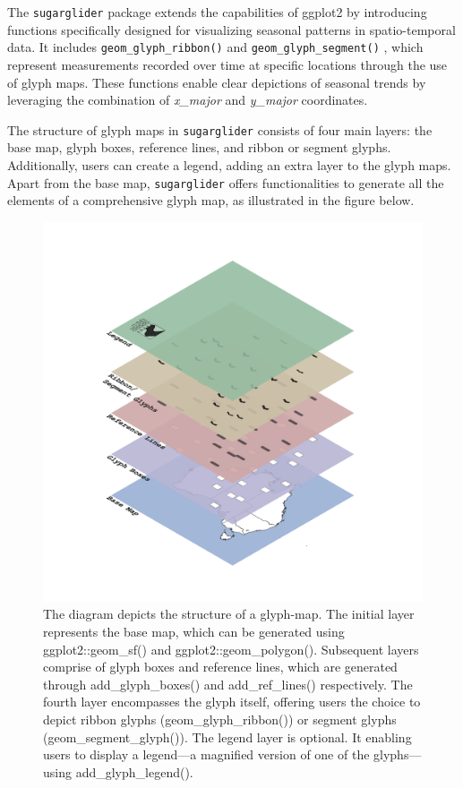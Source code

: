 The \texttt{sugarglider} package extends the capabilities of ggplot2 by introducing functions specifically designed for visualizing seasonal patterns in spatio-temporal data. It includes \texttt{geom\_glyph\_ribbon()} and \texttt{geom\_glyph\_segment()} , which represent measurements recorded over time at specific locations through the use of glyph maps. These functions enable clear depictions of seasonal trends by leveraging the combination of \emph{x\_major} and \emph{y\_major} coordinates.

The structure of glyph maps in \texttt{sugarglider} consists of four main layers: the base map, glyph boxes, reference lines, and ribbon or segment glyphs. Additionally, users can create a legend, adding an extra layer to the glyph maps. Apart from the base map, \texttt{sugarglider} offers functionalities to generate all the elements of a comprehensive glyph map, as illustrated in the figure below.

\begin{figure}
\includegraphics[width=36.11in]{figures/glyphmap-layers} \caption{The diagram depicts the structure of a glyph-map. The initial layer represents the base map, which can be generated using ggplot2::geom_sf() and ggplot2::geom_polygon(). Subsequent layers comprise of glyph boxes and reference lines, which are generated through add_glyph_boxes() and add_ref_lines() respectively. The fourth layer encompasses the glyph itself, offering users the choice to depict ribbon glyphs (geom_glyph_ribbon()) or segment glyphs (geom_segment_glyph()). The legend layer is optional. It enabling users to display a legend—a magnified version of one of the glyphs—using add_glyph_legend().}\label{fig:unnamed-chunk-1}
\end{figure}

